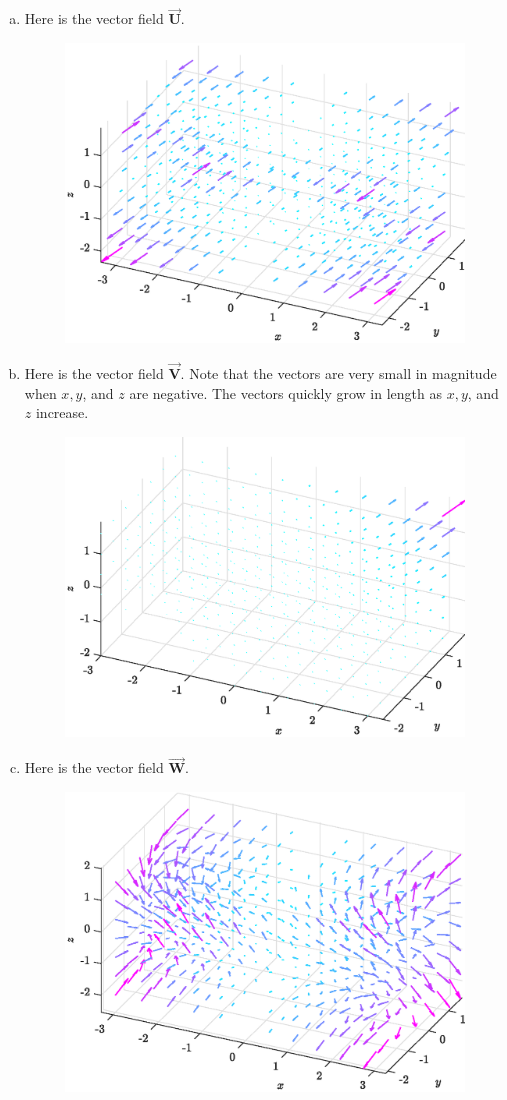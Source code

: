 \documentclass[12pt]{article} %
\newcommand{\vecfieldV}{\boldsymbol{\vec{V}}}
\newcommand{\vecfieldU}{\boldsymbol{\vec{U}}}
\newcommand{\vecfieldW}{\boldsymbol{\vec{W}}}
\begin{document}
\begin{solution}
\begin{enumerate}[(a)]
    \item Here is the vector field $\vecfieldU$.
    \begin{figure}[H]
        \centering
        \includegraphics[width=.65\textwidth]{figures/2a}
    \end{figure}
    \item Here is the vector field $\vecfieldV$. Note that the vectors are very small in magnitude when $x,y$, and $z$ are negative. The vectors quickly grow in length as $x,y$, and $z$ increase.
    \begin{figure}[H]
        \centering
        \includegraphics[width=.65\textwidth]{figures/2b}
    \end{figure}
    \item Here is the vector field $\vecfieldW$.
    \begin{figure}[H]
        \centering
        \includegraphics[width=.65\textwidth]{figures/2c}

\end{figure}
\end{enumerate}
\end{solution}
\end{document}
